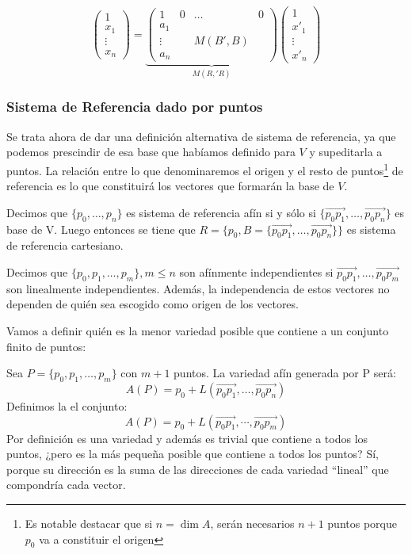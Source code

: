 \documentclass[10pt,a4paper,openright]{book}
\begin{document}
$$\begin{pmatrix}
1 \\ x_1 \\ \vdots \\ x_n
\end{pmatrix} = \underbrace{\left(\begin{array}{c|ccc}
1  & 0 & \ldots & 0 \\
\hline
a_1  &  & & \\
\vdots &  & M(B',B)& \\
a_n & & &
\end{array}
\right)}_{M(R,'R)} \begin{pmatrix}
1 \\ x'_1 \\ \vdots \\ x'_n
\end{pmatrix}$$

\subsubsection*{Sistema de Referencia dado por puntos}
Se trata ahora de dar una definición alternativa de sistema de referencia, ya que podemos prescindir de esa base que habíamos definido para $V$ y supeditarla a puntos. La relación entre lo que denominaremos el origen y el resto de puntos\footnote{Es notable destacar que si $n= \dim A$, serán necesarios $n+1$ puntos porque $p_0$ va a constituir el origen} de referencia es lo que constituirá los vectores que formarán la base de $V$.

Decimos que $\{p_0, \ldots, p_n\}$ es sistema de referencia afín si y sólo si $\{\vec{p_0 p_1}, \ldots, \vec{p_0 p_n}\}$ es base de V. Luego entonces se tiene que $R=\{p_0, B=\{\vec{p_0 p_1}, \ldots, \vec{p_0 p_n}\}\}$ es sistema de referencia cartesiano.

Decimos que $\{p_0, p_1, \ldots, p_m\}, m \leq n$ son afínmente independientes si $\vec{p_0 p_1}, \ldots, \vec{p_0 p_m}$ son linealmente independientes. Además, la independencia de estos vectores no dependen de quién sea escogido como origen de los vectores.


Vamos a definir quién es la menor variedad posible que contiene a un conjunto finito de puntos:

Sea $P = \{p_0, p_1, \ldots, p_m\}$ con $m+1$ puntos. La variedad afín generada por P será:
$$A(P)=p_0 + L(\vec{p_0 p_1}, \ldots, \vec{p_0 p_n})$$
Definimos la el conjunto:
$$A(P)=p_0 + L(\vec{p_0p_1}, \cdots, \vec{p_0p_m})$$
Por definición es una variedad y además es trivial que contiene a todos los puntos, ¿pero es la más pequeña posible que contiene a todos los puntos? Sí, porque su dirección es la suma de las direcciones de cada variedad ``lineal'' que compondría cada vector.
\end{document}
